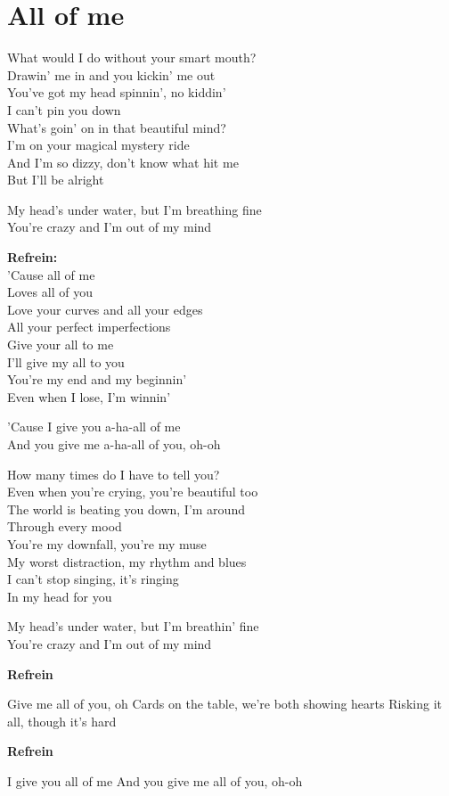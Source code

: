 \section{All of me}
What would I do without your smart mouth?\\
Drawin' me in and you kickin' me out\\
You've got my head spinnin', no kiddin'\\
I can't pin you down\\
What's goin' on in that beautiful mind?\\
I'm on your magical mystery ride\\
And I'm so dizzy, don't know what hit me\\
But I'll be alright

My head's under water, but I'm breathing fine\\
You're crazy and I'm out of my mind

\textbf{Refrein:}\\
'Cause all of me\\
Loves all of you\\
Love your curves and all your edges\\
All your perfect imperfections\\
Give your all to me\\
I'll give my all to you\\
You're my end and my beginnin'\\
Even when I lose, I'm winnin'

'Cause I give you a-ha-all of me\\
And you give me a-ha-all of you, oh-oh

How many times do I have to tell you?\\
Even when you're crying, you're beautiful too\\
The world is beating you down, I'm around\\
Through every mood\\
You're my downfall, you're my muse\\
My worst distraction, my rhythm and blues\\
I can't stop singing, it's ringing\\
In my head for you

My head's under water, but I'm breathin' fine\\
You're crazy and I'm out of my mind

\textbf{Refrein}

Give me all of you, oh
Cards on the table, we're both showing hearts
Risking it all, though it's hard

\textbf{Refrein}

I give you all of me
And you give me all of you, oh-oh